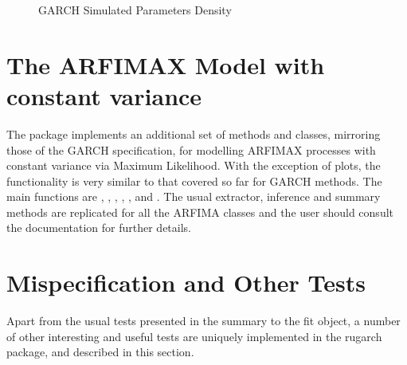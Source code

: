 \begin{landscape}
\begin{figure}[!ht]
\caption[GARCH Simulated Parameters Density]{GARCH Simulated Parameters Density}\label{fig:dist3}
\end{figure}
\end{landscape}
\section{The ARFIMAX Model with constant variance}\label{section:arfima}
The \verb@rugarch@ package implements an additional set of methods and classes,
mirroring those of the GARCH specification, for modelling ARFIMAX processes
with constant variance via Maximum Likelihood. With the exception of plots, the
functionality is very similar to that covered so far for GARCH methods. The main
functions are \verb@arfimaspec@, \verb@arfimafit@, \verb@arfimaforecast@,
\verb@arfimasim@, \verb@arfimapath@, \verb@arfimadistirbution@ and \verb@arfimaroll@.
The usual extractor, inference and summary methods are replicated for all the
ARFIMA classes and the user should consult the documentation for further details.

\section{Mispecification and Other Tests}
Apart from the usual tests presented in the summary to the fit object, a number
of other interesting and useful tests are uniquely implemented in the rugarch
package, and described in this section.
